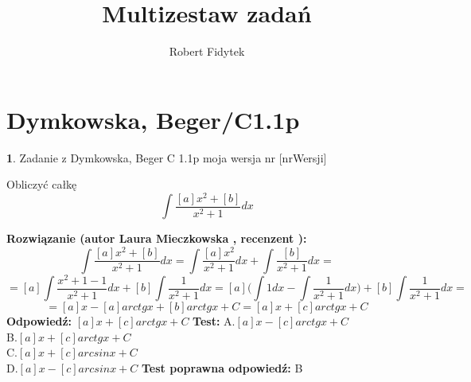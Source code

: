 \documentclass[12pt, a4paper]{article}
\title{Multizestaw zadań}
\author{Robert Fidytek}
\date{}
\theoremstyle{definition} %
\newtheorem{zad}{}
\newcommand{\kategoria}[1]{\section{#1}} %
\newcommand{\zadStart}[1]{\begin{zad}#1\newline} %
\newcommand{\zadStop}{\end{zad}}   %
\newcommand{\rozwStart}[2]{\noindent \textbf{Rozwiązanie (autor #1 , recenzent #2): }\newline} %
\newcommand{\rozwStop}{\newline}                                            %
\newcommand{\odpStart}{\noindent \textbf{Odpowiedź:}\newline}    %
\newcommand{\odpStop}{\newline}                                             %
\newcommand{\testStart}{\noindent \textbf{Test:}\newline} %
\newcommand{\testStop}{\newline} %
\newcommand{\kluczStart}{\noindent \textbf{Test poprawna odpowiedź:}\newline} %
\newcommand{\kluczStop}{\newline} %
\begin{document}
\maketitle


\kategoria{Dymkowska, Beger/C1.1p}
\zadStart{Zadanie z Dymkowska, Beger C 1.1p  moja wersja nr [nrWersji]}

Obliczyć całkę $$\int \frac{[a]x^2+[b]}{x^2+1}dx$$
\zadStop
\rozwStart{Laura Mieczkowska}{}
$$\int \frac{[a]x^2+[b]}{x^2+1}dx= \int\frac{[a]x^2}{x^2+1}dx+\int\frac{[b]}{x^2+1}dx=$$
$$=[a]\int\frac{x^2+1-1}{x^2+1}dx+[b]\int\frac{1}{x^2+1}dx=[a]\bigg(\int 1 dx-\int\frac{1}{x^2+1}dx\bigg)+[b]\int\frac{1}{x^2+1}dx=$$
$$=[a]x-[a]arctgx+[b]arctgx+C=[a]x+[c]arctgx+C$$
\rozwStop
\odpStart
$[a]x+[c]arctgx+C$
\odpStop
\testStart
A.$[a]x-[c]arctgx+C$ \\
B.$[a]x+[c]arctgx+C$ \\
C.$[a]x+[c]arcsinx+C$ \\
D.$[a]x-[c]arcsinx+C$
\testStop
\kluczStart
B
\kluczStop
\end{document}
